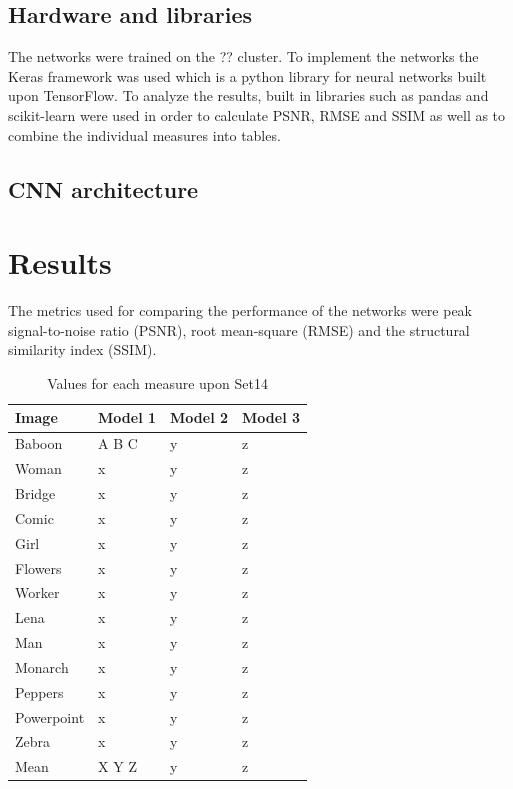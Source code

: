 \documentclass[letterpaper,twocolumn,fleqn]{article}
\begin{document}
\subsection{Hardware and libraries}
The networks were trained on the ?? cluster. To implement the networks the Keras framework was used which is a python library for neural networks built upon TensorFlow. To analyze the results, built in libraries such as pandas and scikit-learn were used in order to calculate PSNR, RMSE and SSIM as well as to combine the individual measures into tables. 


\subsection{CNN architecture}




\section{Results}

The metrics used for comparing the performance of the networks were peak signal-to-noise ratio (PSNR), root mean-square (RMSE) and the structural similarity index (SSIM). 


\begin{table}[!h]
\caption{Values for each measure upon Set14}
\label{tab:fonts}
\begin{center}       
\begin{tabular}{|p{}|p{}|p{}|p{}|} 
\hline
Image & Model 1 & Model 2 & Model 3 \\ \hline
Baboon & A B C & y & z \\ \hline
Woman & x & y & z \\ \hline
Bridge & x & y & z \\ \hline
Comic & x & y & z \\ \hline
Girl & x & y & z \\ \hline
Flowers & x & y & z \\ \hline
Worker & x & y & z \\ \hline
Lena & x & y & z \\ \hline
Man & x & y & z \\ \hline
Monarch & x & y & z \\ \hline
Peppers & x & y & z \\ \hline
Powerpoint & x & y & z \\ \hline
Zebra & x & y & z \\ \hline
Mean & X Y Z & y & z \\ \hline
\end{tabular}
\end{center}
\end{table} 
\end{document}
